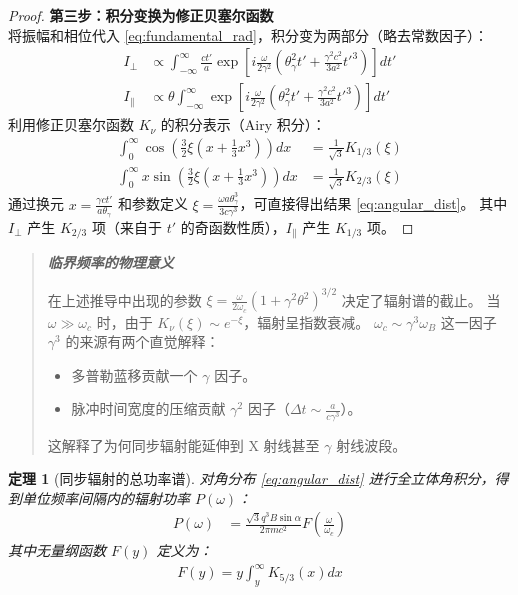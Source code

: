\documentclass[12pt,oneside]{ctexart}
\theoremstyle{definition}
\theoremstyle{plain}
\newtheorem{theorem}[definition]{定理}
\theoremstyle{remark}
\newif\ifshowderiv
\newcommand{\derivdefaulttitle}{额外说明}
\newenvironment{derivationnote}[1][\derivdefaulttitle]{%
  \ifshowderiv\begin{quote}\small\itshape
  \noindent\textbf{#1}\;\par
}{%
  \end{quote}\fi
}
\begin{document}
\begin{proof}
    \textbf{第三步：积分变换为修正贝塞尔函数} \\
    将振幅和相位代入 \eqref{eq:fundamental_rad}，积分变为两部分（略去常数因子）：
    \begin{align}
        I_\perp &\propto \int_{-\infty}^{\infty} \frac{ct'}{a} \exp\left[ i \frac{\omega}{2\gamma^2} \left( \theta_\gamma^2 t' + \frac{\gamma^2 c^2}{3a^2} t'^3 \right) \right] dt' \\
        I_\parallel &\propto \theta \int_{-\infty}^{\infty} \exp\left[ i \frac{\omega}{2\gamma^2} \left( \theta_\gamma^2 t' + \frac{\gamma^2 c^2}{3a^2} t'^3 \right) \right] dt'
    \end{align}
    利用修正贝塞尔函数 $K_\nu$ 的积分表示（Airy 积分）：
    \begin{align}
        \int_0^\infty \cos\left( \frac{3}{2}\xi \left( x + \frac{1}{3}x^3 \right) \right) dx &= \frac{1}{\sqrt{3}} K_{1/3}(\xi) \\
        \int_0^\infty x \sin\left( \frac{3}{2}\xi \left( x + \frac{1}{3}x^3 \right) \right) dx &= \frac{1}{\sqrt{3}} K_{2/3}(\xi)
    \end{align}
    通过换元 $x = \frac{\gamma c t'}{a \theta_\gamma}$ 和参数定义 $\xi = \frac{\omega a \theta_\gamma^3}{3c\gamma^3}$，可直接得出结果 \eqref{eq:angular_dist}。
    其中 $I_\perp$ 产生 $K_{2/3}$ 项（来自于 $t'$ 的奇函数性质），$I_\parallel$ 产生 $K_{1/3}$ 项。
\end{proof}

\begin{derivationnote}[临界频率的物理意义]
    在上述推导中出现的参数 $\xi = \frac{\omega}{2\omega_c}(1+\gamma^2\theta^2)^{3/2}$ 决定了辐射谱的截止。
    当 $\omega \gg \omega_c$ 时，由于 $K_\nu(\xi) \sim e^{-\xi}$，辐射呈指数衰减。
    $\omega_c \sim \gamma^3 \omega_B$ 这一因子 $\gamma^3$ 的来源有两个直觉解释：
    \begin{itemize}
        \item 多普勒蓝移贡献一个 $\gamma$ 因子。
        \item 脉冲时间宽度的压缩贡献 $\gamma^2$ 因子（$\Delta t \sim \frac{a}{c\gamma^3}$）。
    \end{itemize}
    这解释了为何同步辐射能延伸到 X 射线甚至 $\gamma$ 射线波段。
\end{derivationnote}

\begin{theorem}[同步辐射的总功率谱]
    对角分布 \eqref{eq:angular_dist} 进行全立体角积分，得到单位频率间隔内的辐射功率 $P(\omega)$：
    \begin{align}
        P(\omega) &= \frac{\sqrt{3} q^3 B \sin\alpha}{2\pi m c^2} F\left( \frac{\omega}{\omega_c} \right) \label{eq:power_spec}
    \end{align}
    其中无量纲函数 $F(y)$ 定义为：
    \begin{align}
        F(y) = y \int_y^\infty K_{5/3}(x) dx
    \end{align}
\end{theorem}
\end{document}
